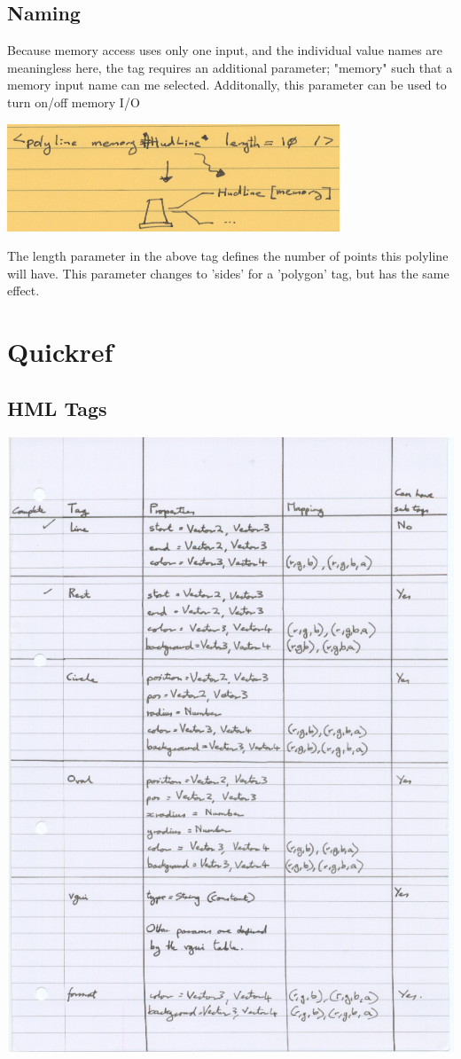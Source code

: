 \documentclass[10pt,a4paper]{article}
\begin{document}
\subsection{Naming}

Because memory access uses only one input, and the individual value names are meaningless here, the tag requires an additional parameter; "memory" such that a memory input name can me selected. Additonally, this parameter can be used to turn on/off memory I/O

\includegraphics[scale=0.75]{images/memory/memory_input.png}

The length parameter in the above tag defines the number of points this polyline will have.  This parameter changes to 'sides' for a 'polygon' tag, but has the same effect.



\section{Quickref}
\subsection{HML Tags}

\includegraphics[scale=0.75]{images/quickref/tags.png}
\end{document}
